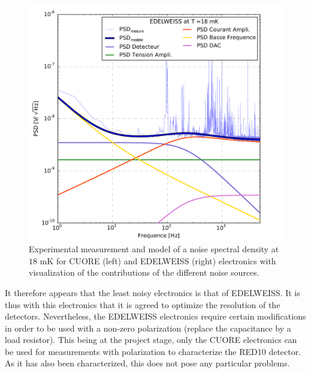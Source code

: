 \begin{figure}[!ht]
\begin{minipage}{0.49\textwidth}
\includegraphics[width=\textwidth]{Images/edel_18.pdf}
\end{minipage}
\caption{Experimental measurement and model of a noise spectral density at $18$ mK for CUORE (left) and EDELWEISS (right) electronics with visualization of the contributions of the different noise sources.}
\label{noise-sources}
\end{figure}

It therefore appears that the least noisy electronics is that of EDELWEISS. It is thus with this electronics that it is agreed to optimize the resolution of the detectors. Nevertheless, the EDELWEISS electronics require certain modifications in order to be used with a non-zero polarization (replace the capacitance by a load resistor). This being at the project stage, only the CUORE electronics can be used for measurements with polarization to characterize the RED10 detector. As it has also been characterized, this does not pose any particular problems.

